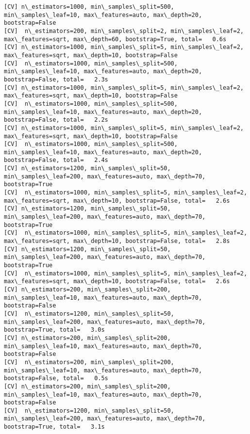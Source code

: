 \documentclass[11pt]{article}
\begin{document}
\begin{Verbatim}[commandchars=\\\{\}]
[CV] n\_estimators=1000, min\_samples\_split=500, min\_samples\_leaf=10, max\_features=auto, max\_depth=20, bootstrap=False 
[CV]  n\_estimators=200, min\_samples\_split=2, min\_samples\_leaf=2, max\_features=sqrt, max\_depth=60, bootstrap=True, total=   0.6s
[CV] n\_estimators=1000, min\_samples\_split=5, min\_samples\_leaf=2, max\_features=sqrt, max\_depth=10, bootstrap=False 
[CV]  n\_estimators=1000, min\_samples\_split=500, min\_samples\_leaf=10, max\_features=auto, max\_depth=20, bootstrap=False, total=   2.3s
[CV] n\_estimators=1000, min\_samples\_split=5, min\_samples\_leaf=2, max\_features=sqrt, max\_depth=10, bootstrap=False 
[CV]  n\_estimators=1000, min\_samples\_split=500, min\_samples\_leaf=10, max\_features=auto, max\_depth=20, bootstrap=False, total=   2.2s
[CV] n\_estimators=1000, min\_samples\_split=5, min\_samples\_leaf=2, max\_features=sqrt, max\_depth=10, bootstrap=False 
[CV]  n\_estimators=1000, min\_samples\_split=500, min\_samples\_leaf=10, max\_features=auto, max\_depth=20, bootstrap=False, total=   2.4s
[CV] n\_estimators=1200, min\_samples\_split=50, min\_samples\_leaf=200, max\_features=auto, max\_depth=70, bootstrap=True 
[CV]  n\_estimators=1000, min\_samples\_split=5, min\_samples\_leaf=2, max\_features=sqrt, max\_depth=10, bootstrap=False, total=   2.6s
[CV] n\_estimators=1200, min\_samples\_split=50, min\_samples\_leaf=200, max\_features=auto, max\_depth=70, bootstrap=True 
[CV]  n\_estimators=1000, min\_samples\_split=5, min\_samples\_leaf=2, max\_features=sqrt, max\_depth=10, bootstrap=False, total=   2.8s
[CV] n\_estimators=1200, min\_samples\_split=50, min\_samples\_leaf=200, max\_features=auto, max\_depth=70, bootstrap=True 
[CV]  n\_estimators=1000, min\_samples\_split=5, min\_samples\_leaf=2, max\_features=sqrt, max\_depth=10, bootstrap=False, total=   2.6s
[CV] n\_estimators=200, min\_samples\_split=200, min\_samples\_leaf=10, max\_features=auto, max\_depth=70, bootstrap=False 
[CV]  n\_estimators=1200, min\_samples\_split=50, min\_samples\_leaf=200, max\_features=auto, max\_depth=70, bootstrap=True, total=   3.0s
[CV] n\_estimators=200, min\_samples\_split=200, min\_samples\_leaf=10, max\_features=auto, max\_depth=70, bootstrap=False 
[CV]  n\_estimators=200, min\_samples\_split=200, min\_samples\_leaf=10, max\_features=auto, max\_depth=70, bootstrap=False, total=   0.5s
[CV] n\_estimators=200, min\_samples\_split=200, min\_samples\_leaf=10, max\_features=auto, max\_depth=70, bootstrap=False 
[CV]  n\_estimators=1200, min\_samples\_split=50, min\_samples\_leaf=200, max\_features=auto, max\_depth=70, bootstrap=True, total=   3.1s

\end{Verbatim}
\end{document}
